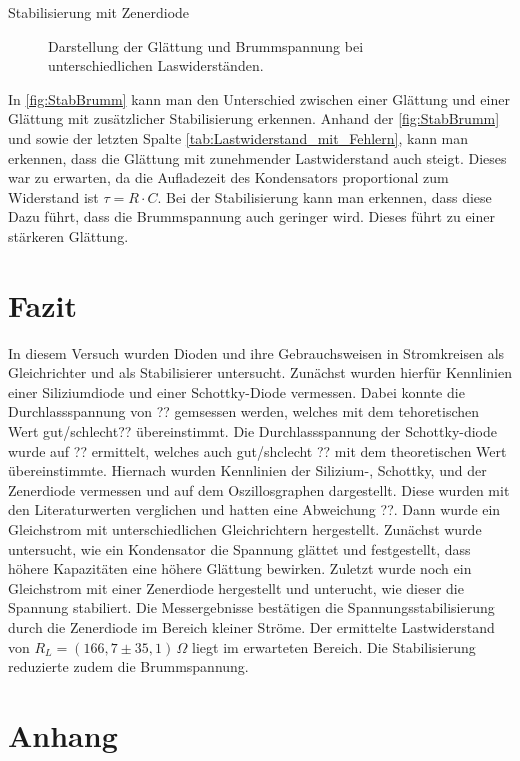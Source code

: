 \documentclass{article}
\theoremstyle{definition}
\begin{document}
\begin{aufgabe}{Stabilisierung mit Zenerdiode}
\begin{figure}[h!]
    \caption{Darstellung der Glättung und Brummspannung bei unterschiedlichen Laswiderständen.}
    \label{fig:StabBrumm}
\end{figure}

In \autoref{fig:StabBrumm} kann man den Unterschied zwischen einer Glättung und einer Glättung mit zusätzlicher Stabilisierung erkennen. Anhand der \autoref{fig:StabBrumm} und sowie der letzten Spalte \autoref{tab:Lastwiderstand_mit_Fehlern}, kann man erkennen, dass die Glättung mit zunehmender Lastwiderstand auch steigt. Dieses war zu erwarten, da die Aufladezeit des Kondensators proportional zum Widerstand ist $\tau = R \cdot C$. Bei der Stabilisierung kann man erkennen, dass diese Dazu führt, dass die Brummspannung auch geringer wird. Dieses führt zu einer stärkeren Glättung.

\end{aufgabe}




\section{Fazit}
In diesem Versuch wurden Dioden und ihre Gebrauchsweisen in Stromkreisen als Gleichrichter und als Stabilisierer untersucht. 
Zunächst wurden hierfür Kennlinien einer Siliziumdiode und einer Schottky-Diode vermessen. Dabei konnte die Durchlassspannung von ?? gemsessen werden, 
welches mit dem tehoretischen Wert gut/schlecht?? übereinstimmt. Die Durchlassspannung der Schottky-diode wurde auf ?? ermittelt, welches auch gut/shclecht ?? mit dem theoretischen Wert übereinstimmte. 
Hiernach wurden Kennlinien der Silizium-, Schottky, und der Zenerdiode vermessen und auf dem Oszillosgraphen dargestellt. Diese wurden mit den Literaturwerten verglichen und hatten eine Abweichung ??. 
Dann wurde ein Gleichstrom mit unterschiedlichen Gleichrichtern hergestellt. Zunächst wurde untersucht, wie ein Kondensator die Spannung glättet und festgestellt, dass höhere Kapazitäten eine höhere Glättung bewirken. 
Zuletzt wurde noch ein Gleichstrom mit einer Zenerdiode hergestellt und unterucht, wie dieser die Spannung stabiliert. 
Die Messergebnisse bestätigen die Spannungsstabilisierung durch die Zenerdiode im Bereich kleiner Ströme. 
Der ermittelte Lastwiderstand von \( R_L = (166{,}7 \pm 35{,}1)\,\Omega \) liegt im erwarteten Bereich. 
Die Stabilisierung reduzierte zudem die Brummspannung.

\section{Anhang}
\end{document}
